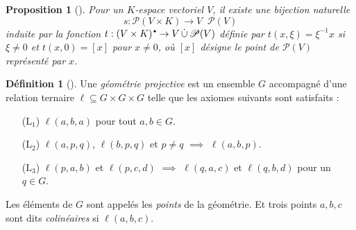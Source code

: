 \documentclass[12pt, oneside]{memoir}
\newtheorem{prop}{Proposition}
\theoremstyle{definition}
\newtheorem{defn}{Définition}
\theoremstyle{remark}
\newcommand{\unbutton}[1][.6]{\mathbin{\hspace{1pt}\vcenter{\hbox{\scalebox{#1}{$\bullet$}}}}}
\newcommand{\proj}{\boldsymbol{\mathscr{P}}}
\newcommand{\discup}{\mathop{\dot{\cup}}}
\begin{document}
\begin{prop}[{\cite[28]{ff00}}]
  Pour un $K$-espace vectoriel $V$, il existe une bijection naturelle
  \begin{equation*}
    \label{natural-bijection}
    s: \proj(V \times K) \to V \discup \proj(V)
  \end{equation*}
  induite par la fonction
  $t: (V \times K)^{\unbutton} \to V \discup \proj(V)$ définie par
  $t(x,\xi) = \xi^{-1}x$ si $\xi \neq 0$ et $t(x,0) = [x]$ pour
  $x \neq 0$, où $[x]$ désigne le point de $\proj(V)$ représenté par
  $x$.
\end{prop}

\begin{defn}[{\cite[26]{ff00}}]
  \label{projective-geometry}
  Une \textit{géométrie projective} est un ensemble $G$ accompagné
  d'une relation ternaire $\ell \subseteq G \times G \times G$ telle
  que les axiomes suivants sont satisfaits :
  \begin{itemize}[align=left]
  \item[($\text{L}_1$)] $\ell(a,b,a)$ pour tout $a, b \in G$.
  \item[($\text{L}_2$)] $\ell(a,p,q)$, $\ell(b,p,q)$ et $p \neq q$
    $\implies$ $\ell(a,b,p)$.
  \item[($\text{L}_3$)] $\ell(p,a,b)$ et $\ell(p,c,d)$ $\implies$
    $\ell(q,a,c)$ et $\ell(q,b,d)$ pour un $q \in G$.
  \end{itemize}
  Les éléments de $G$ sont appelés les \textit{points} de la
  géométrie. Et trois points $a, b, c$ sont dits \textit{colinéaires}
  si $\ell(a,b,c)$.
\end{defn}
\end{document}
